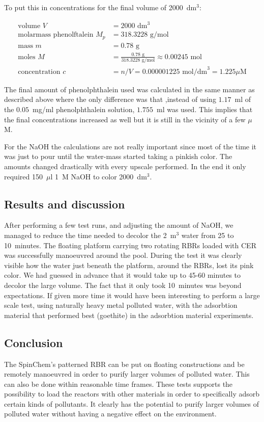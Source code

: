 To put this in concentrations for the final volume of 2000~dm$^3$:

\begin{align}
    \text{volume } V &= 2000 \text{ dm}^3 \\
    \text{molarmass phenolftalein } M_p &= 318.3228 \text{ g/mol} \\
    \text{mass } m &= 0.78 \text{ g} \\
    \text{moles } M &= \frac{0.78 \text{ g}}{318.3228 \text{ g/mol}} \approx 0.00245 \text{ mol} \\
    \text{concentration } c &= n/V = 0.000001225 \text{ mol/dm}^3 = 1.225 \mu\text{M}
\end{align}

The final amount of phenolphthalein used was calculated in the same manner as described above where the only difference was that ,instead of using $1.17$~ml of the $0.05$~mg/ml phenolphthalein solution, $1.755$~ml was used.
This implies that the final concentrations increased as well but it is still in the vicinity of a few $\mu$M.

For the NaOH the calculations are not really important since most of the time it was just to pour until the water-mass started taking a pinkish color. The amounts changed drastically with every upscale performed. In the end it only required 150~$\mu$l 1~M NaOH to color 2000~dm$^3$.

\subsection{Results and discussion}
After performing a few test runs, and adjusting the amount of NaOH, we managed to reduce the time needed to decolor the 2~m$^3$ water from 25 to 10~minutes. The floating platform carrying two rotating RBRs loaded with CER was successfully manoeuvred around the pool. During the test it was clearly visible how the water just beneath the platform, around the RBRs, lost its pink color.
We had guessed in advance that it would take up to 45-60 minutes to decolor the large volume. The fact that it only took 10~minutes was beyond expectations. If given more time it would have been interesting to perform a large scale test, using naturally heavy metal polluted water, with the adsorbtion material that performed best (goethite) in the adsorbtion material experiments. 

\subsection{Conclusion}
The SpinChem\textsuperscript{\textregistered}'s patterned RBR can be put on floating constructions and be remotely manoeuvred in order to purify larger volumes of polluted water. This can also be done within reasonable time frames. These tests supports the possibility to load the reactors with other materials in order to specifically adsorb certain kinds of pollutants. It clearly has the potential to purify larger volumes of polluted water without having a negative effect on the environment.
